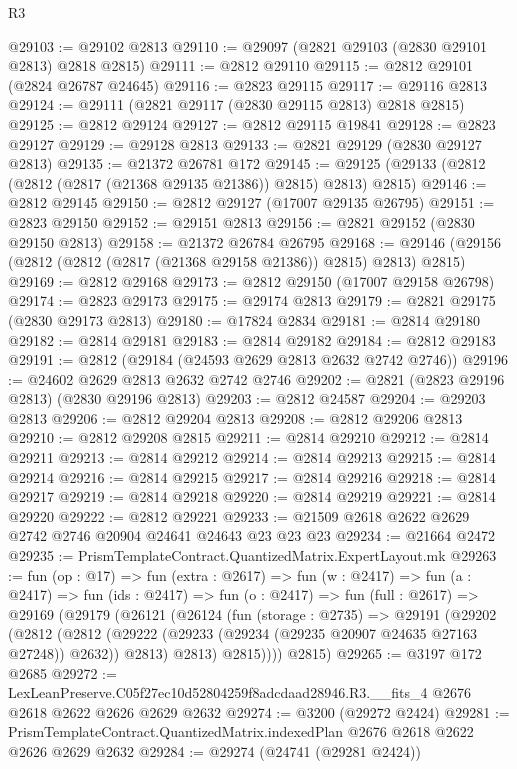 \begin{lexlean}{R3}
\begin{coremodule}
@29103 := @29102 @2813
@29110 := @29097 (@2821 @29103 (@2830 @29101 @2813) @2818 @2815)
@29111 := @2812 @29110
@29115 := @2812 @29101 (@2824 @26787 @24645)
@29116 := @2823 @29115
@29117 := @29116 @2813
@29124 := @29111 (@2821 @29117 (@2830 @29115 @2813) @2818 @2815)
@29125 := @2812 @29124
@29127 := @2812 @29115 @19841
@29128 := @2823 @29127
@29129 := @29128 @2813
@29133 := @2821 @29129 (@2830 @29127 @2813)
@29135 := @21372 @26781 @172
@29145 := @29125 (@29133 (@2812 (@2812 (@2817 (@21368 @29135 @21386)) @2815) @2813) @2815)
@29146 := @2812 @29145
@29150 := @2812 @29127 (@17007 @29135 @26795)
@29151 := @2823 @29150
@29152 := @29151 @2813
@29156 := @2821 @29152 (@2830 @29150 @2813)
@29158 := @21372 @26784 @26795
@29168 := @29146 (@29156 (@2812 (@2812 (@2817 (@21368 @29158 @21386)) @2815) @2813) @2815)
@29169 := @2812 @29168
@29173 := @2812 @29150 (@17007 @29158 @26798)
@29174 := @2823 @29173
@29175 := @29174 @2813
@29179 := @2821 @29175 (@2830 @29173 @2813)
@29180 := @17824 @2834
@29181 := @2814 @29180
@29182 := @2814 @29181
@29183 := @2814 @29182
@29184 := @2812 @29183
@29191 := @2812 (@29184 (@24593 @2629 @2813 @2632 @2742 @2746))
@29196 := @24602 @2629 @2813 @2632 @2742 @2746
@29202 := @2821 (@2823 @29196 @2813) (@2830 @29196 @2813)
@29203 := @2812 @24587
@29204 := @29203 @2813
@29206 := @2812 @29204 @2813
@29208 := @2812 @29206 @2813
@29210 := @2812 @29208 @2815
@29211 := @2814 @29210
@29212 := @2814 @29211
@29213 := @2814 @29212
@29214 := @2814 @29213
@29215 := @2814 @29214
@29216 := @2814 @29215
@29217 := @2814 @29216
@29218 := @2814 @29217
@29219 := @2814 @29218
@29220 := @2814 @29219
@29221 := @2814 @29220
@29222 := @2812 @29221
@29233 := @21509 @2618 @2622 @2629 @2742 @2746 @20904 @24641 @24643 @23 @23 @23
@29234 := @21664 @2472
@29235 := PrismTemplateContract.QuantizedMatrix.ExpertLayout.mk
@29263 := fun (op : @17) =>
  fun (extra : @2617) =>
  fun (w : @2417) =>
  fun (a : @2417) =>
  fun (ids : @2417) =>
  fun (o : @2417) =>
  fun (full : @2617) =>
  @29169
    (@29179
      (@26121
        (@26124
          (fun (storage : @2735) =>
          @29191
            (@29202
              (@2812
                (@2812 (@29222 (@29233 (@29234 (@29235 @20907 @24635 @27163 @27248)) @2632)) @2813)
                @2813)
              @2815))))
      @2815)
@29265 := @3197 @172 @2685
@29272 := LexLeanPreserve.C05f27ec10d52804259f8adcdaad28946.R3.__fits_4
    @2676
    @2618
    @2622
    @2626
    @2629
    @2632
@29274 := @3200 (@29272 @2424)
@29281 := PrismTemplateContract.QuantizedMatrix.indexedPlan @2676 @2618 @2622 @2626 @2629 @2632
@29284 := @29274 (@24741 (@29281 @2424))

\end{coremodule}
\end{lexlean}
